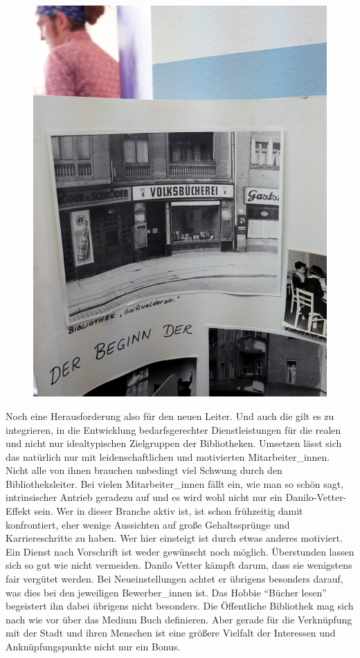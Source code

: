 \documentclass[a4paper,
fontsize=11pt,
oneside,
numbers=noperiodatend,
parskip=half-,
bibliography=totoc,
final
]{scrartcl}
\begin{document}
\begin{figure}
\centering
\includegraphics{img/pankow-volksbuecherei.jpg}
\caption{}
\end{figure}

Noch eine Herausforderung also für den neuen Leiter. Und auch die gilt
es zu integrieren, in die Entwicklung bedarfsgerechter Dienstleistungen
für die realen und nicht nur idealtypischen Zielgruppen der
Bibliotheken. Umsetzen lässt sich das natürlich nur mit
leidenschaftlichen und motivierten Mitarbeiter\_innen. Nicht alle von
ihnen brauchen unbedingt viel Schwung durch den Bibliotheksleiter. Bei
vielen Mitarbeiter\_innen fällt ein, wie man so schön sagt,
intrinsischer Antrieb geradezu auf und es wird wohl nicht nur ein
Danilo-Vetter-Effekt sein. Wer in dieser Branche aktiv ist, ist schon
frühzeitig damit konfrontiert, eher wenige Aussichten auf große
Gehaltssprünge und Karriereschritte zu haben. Wer hier einsteigt ist
durch etwas anderes motiviert. Ein Dienst nach Vorschrift ist weder
gewünscht noch möglich. Überstunden lassen sich so gut wie nicht
vermeiden. Danilo Vetter kämpft darum, dass sie wenigstens fair vergütet
werden. Bei Neueinstellungen achtet er übrigens besonders darauf, was
dies bei den jeweiligen Bewerber\_innen ist. Das Hobbie \enquote{Bücher
lesen} begeistert ihn dabei übrigens nicht besonders. Die Öffentliche
Bibliothek mag sich nach wie vor über das Medium Buch definieren. Aber
gerade für die Verknüpfung mit der Stadt und ihren Menschen ist eine
größere Vielfalt der Interessen und Anknüpfungspunkte nicht nur ein
Bonus.
\end{document}
